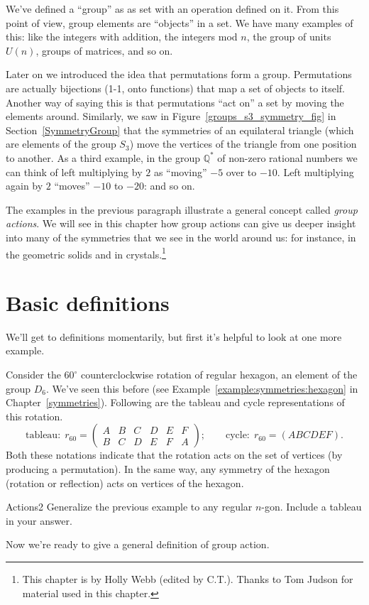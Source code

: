 We've defined a  ``group'' as as set with an operation defined on it.  From this point of view, group elements are ``objects'' in a set. We have many examples of this: like the integers with addition, the integers mod $n$, the group of units $U(n)$, groups of matrices, and so on.

Later on we introduced the idea that permutations form a group. Permutations are actually bijections (1-1, onto functions) that map a set of objects to itself.  Another way of saying this is that permutations ``act on'' a set by moving the elements around.  Similarly, we saw in Figure~\ref{groups_s3_symmetry_fig} in Section~\ref{SymmetryGroup} that the symmetries of an equilateral triangle (which are elements of the group $S_3$) move the vertices of the triangle from one position to another.  As a third example, in the group $\mathbb {Q}^*$ of non-zero rational numbers we can think of left multiplying by $2$ as ``moving''  $-5$ over to $-10$.  Left multiplying again by $2$ ``moves'' $-10$ to $-20$: and so on.   

The examples in the previous paragraph  illustrate a general concept called \emph{group actions}. We will see in this chapter how group actions can give us deeper insight into many of the symmetries that we see in the world around us: for instance, in the geometric solids and in crystals.\footnote{This chapter  is by Holly Webb (edited by C.T.). Thanks to Tom Judson for material used in this chapter.}

\section {Basic definitions}\label{DefActions}
We'll get to definitions momentarily, but first it's helpful to look at one more example.

\begin{example}\label{example:actions:Actions1} 
Consider the $60^{\circ}$ counterclockwise rotation of regular hexagon, an element of the group $D_6$.  We've seen this before (see Example~\ref{example:symmetries:hexagon} in Chapter~\ref{symmetries}). Following are the tableau and cycle representations of this rotation. 
\[ \text{tableau:}~~r_{60} = \begin{pmatrix} A & B & C & D & E & F \\ B & C & D & E & F  & A \end{pmatrix}; \qquad 
\text{cycle:}~~r_{60}=(A B C D E F).\]
 Both these notations indicate that the rotation acts on the set of vertices (by producing a permutation).  In the same way, any symmetry of the hexagon (rotation or reflection) acts on vertices of the hexagon.
\end{example}
	\begin {exercise}{Actions2}  Generalize the previous example to any regular $n$-gon. Include a tableau in your answer.
\end {exercise}
Now we're ready to give a general definition of group action. 

